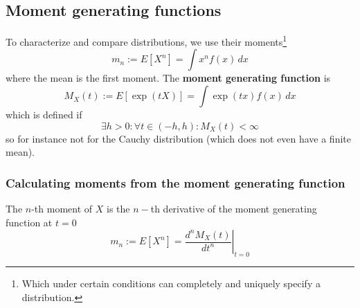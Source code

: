 \subsection{Moment generating functions}
To characterize and compare distributions, we use their moments\footnote{Which under certain conditions can completely and uniquely specify a distribution.}
\begin{equation}
    m_n := E[X^n] = \int x^n f(x) \, dx
\end{equation}
where the mean is the first moment. The \textbf{moment generating function} is
\begin{equation}
    \boxed{M_X(t) := E[\exp(tX)]} = \int \exp(tx) f(x) \, dx
\end{equation}
which is defined if
\begin{equation}
    \exists h > 0: \forall t \in (-h,h): M_X(t) < \infty
\end{equation}
so for instance not for the Cauchy distribution (which does not even have a finite mean).


\subsubsection{Calculating moments from the moment generating function}
The $n$-th moment of $X$ is the $n-$th derivative of the moment generating function at $t=0$
\begin{equation}
    m_n := E[X^n] = \left.\frac{d^n M_X(t)}{dt^n}\right|_{t=0}
\end{equation}


